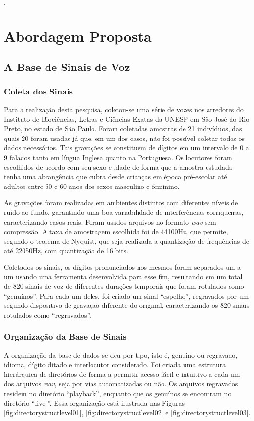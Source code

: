 ,\chapter{Abordagem Proposta} \label{chap:propApproach}
	\section{A Base de Sinais de Voz}
	    \subsection{Coleta dos Sinais}
		\par Para a realização desta pesquisa, coletou-se uma série de vozes nos arredores do Instituto de Biociências, Letras e Ciências Exatas da UNESP em São José do Rio Preto, no estado de São Paulo. Foram coletadas amostras de 21 indivíduos, das quais 20 foram usadas já que, em um dos casos, não foi possível coletar todos os dados necessários. Tais gravações se constituem de dígitos em um intervalo de 0 a 9 falados tanto em língua Inglesa quanto na Portuguesa. Os locutores foram escolhidos de acordo com seu sexo e idade de forma que a amostra estudada tenha uma abrangência que cubra desde crianças em época pré-escolar até adultos entre 50 e 60 anos dos sexos masculino e feminino.
					
		\par As gravações foram realizadas em ambientes distintos com diferentes níveis de ruído ao fundo, garantindo uma boa variabilidade de interferências corriqueiras, caracterizando casos reais. Foram usados arquivos no formato \textit{wav} sem compressão. A taxa de amostragem escolhida foi de 44100Hz, que permite, segundo o teorema de Nyquist, que seja realizada a quantização de frequências de até 22050Hz, com quantização de 16 bits.
		
		\par Coletados os sinais, os dígitos pronunciados nos mesmos foram separados um-a-um usando uma ferramenta desenvolvida para esse fim, resultando em um total de 820 sinais de voz de diferentes durações temporais que foram rotulados como ``genuínos''. Para cada um deles, foi criado um sinal ``espelho'',  regravados por um segundo dispositivo de gravação diferente do original, caracterizando os 820 sinais rotulados como ``regravados''.

	    \subsection{Organização da Base de Sinais}
		\par A organização da base de dados se deu por tipo, isto é, genuíno ou regravado, idioma, dígito ditado e interlocutor considerado. Foi criada uma estrutura hierárquica de diretórios de forma a permitir acesso fácil e intuitivo a cada um dos arquivos \textit{wav}, seja por vias automatizadas ou não. Os arquivos regravados residem no diretório ``playback'', enquanto que os genuínos se encontram no diretório ``live ''.	Essa organização está ilustrada nas Figuras \ref{fig:directorystructlevel01}, \ref{fig:directorystructlevel02} e \ref{fig:directorystructlevel03}.
		
